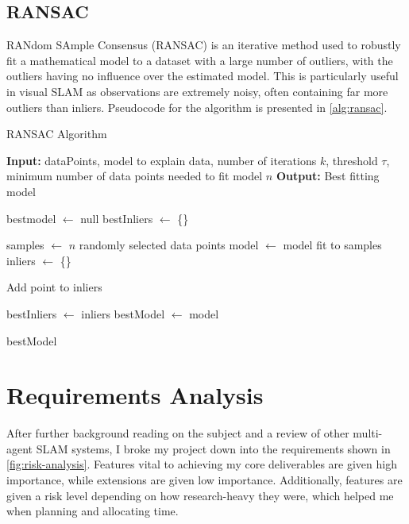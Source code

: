 \subsection{RANSAC}
\label{sec:ransac}

RANdom SAmple Consensus (RANSAC) is an iterative method used to robustly fit a mathematical model to a dataset with a large number of outliers, with the outliers having no influence over the estimated model. This is particularly useful in visual SLAM as observations are extremely noisy, often containing far more outliers than inliers. Pseudocode for the algorithm is presented in \autoref{alg:ransac}.

\begin{algorithm}[h]
    \caption{RANSAC Algorithm}
    \label{alg:ransac}
    \begin{algorithmic}[1]
        \State \textbf{Input:} dataPoints, model to explain data, number of iterations $k$, threshold $\tau$, minimum number of data points needed to fit model $n$
        \State \textbf{Output:} Best fitting model

        \State bestmodel $\leftarrow$ null
        \State bestInliers $\leftarrow$ \{\}

        \State samples $\leftarrow$ $n$ randomly selected data points
        \State model $\leftarrow$ model fit to samples
        \State inliers $\leftarrow$ \{\}

        \State Add point to inliers
        \EndIf
        \EndFor

        \State bestInliers $\leftarrow$ inliers
        \State bestModel $\leftarrow$ model
        \EndIf
        \EndFor

        \State \Return bestModel
    \end{algorithmic}
\end{algorithm}


\section{Requirements Analysis}
\label{sec:requirements-analysis}
After further background reading on the subject and a review of other multi-agent SLAM systems, I broke my project down into the requirements shown in \autoref{fig:risk-analysis}. Features vital to achieving my core deliverables are given high importance, while extensions are given low importance. Additionally, features are given a risk level depending on how research-heavy they were, which helped me when planning and allocating time.


